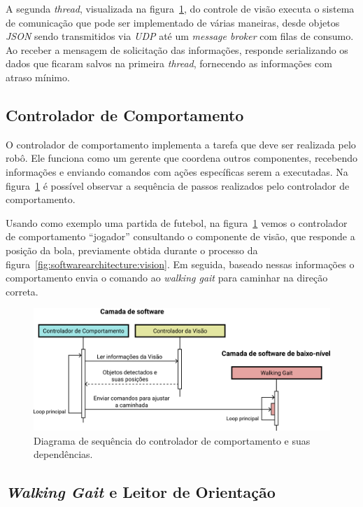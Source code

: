 A segunda \textit{thread}, visualizada na figura~\ref{fig:softwarearchitecture:software}, do controle de visão executa o sistema de comunicação que pode ser implementado de várias maneiras, desde objetos \textit{JSON} sendo transmitidos via \textit{UDP} até um \textit{message broker} com filas de consumo. Ao receber a mensagem de solicitação das informações, responde serializando os dados que ficaram salvos na primeira \textit{thread}, fornecendo as informações com atraso mínimo.

\subsection{Controlador de Comportamento}

O controlador de comportamento implementa a tarefa que deve ser realizada pelo robô. Ele funciona como um gerente que coordena outros componentes, recebendo informações e enviando comandos com ações específicas serem a executadas. Na figura~\ref{fig:softwarearchitecture:software} é possível observar a sequência de passos realizados pelo controlador de comportamento.

Usando como exemplo uma partida de futebol, na figura~\ref{fig:softwarearchitecture:software} vemos o controlador de comportamento ``jogador'' consultando o componente de visão, que responde a posição da bola, previamente obtida durante o processo da figura~\ref{fig:softwarearchitecture:vision}. Em seguida, baseado nessas informações o comportamento envia o comando ao \textit{walking gait} para caminhar na direção correta.

\begin{figure}[htb]
	\centering
	\includegraphics[scale=1]{imagens/svg/softwarearchitecture-software}
	\caption{Diagrama de sequência do controlador de comportamento e suas dependências.}
	\label{fig:softwarearchitecture:software}
\end{figure}

\subsection{\textit{Walking Gait} e Leitor de Orientação}

